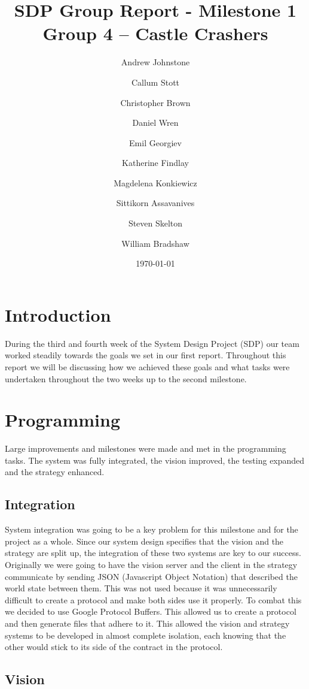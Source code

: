 \documentclass[12pt, a4paper, titlepage]{article}
\title{\small{SDP Group Report - Milestone 1} \\ \huge Group 4 -- Castle Crashers}
\author{Andrew Johnstone \and Callum Stott \and Christopher Brown \and Daniel Wren \and Emil Georgiev \and Katherine Findlay \and Magdelena Konkiewicz \and Sittikorn Assavanives \and Steven Skelton \and William Bradshaw}
\date{\today}
\begin{document}
\maketitle

\section{Introduction}

During the third and fourth week of the System Design Project (SDP) our team
worked steadily towards the goals we set in our first report. Throughout this
report we will be discussing how we achieved these goals and what tasks were
undertaken throughout the two weeks up to the second milestone.

\section{Programming}

Large improvements and milestones were made and met in the programming tasks.
The system was fully integrated, the vision improved, the testing expanded and
the strategy enhanced.

\subsection{Integration}

System integration was going to be a key problem for this milestone and for
the project as a whole. Since our system design specifies that the vision
and the strategy are split up, the integration of these two systems are
key to our success. Originally we were going to have the vision server and
the client in the strategy communicate by sending JSON (Javascript Object
Notation) that described the world state between them. This was not used
because it was unnecessarily difficult to create a protocol and make both
sides use it properly. To combat this we decided to use Google Protocol
Buffers\cite{protobuf}. This allowed us to create a protocol and then generate
files that adhere to it. This allowed the vision and strategy systems to be
developed in almost complete isolation, each knowing that the other would stick
to its side of the contract in the protocol.

\subsection{Vision}
\end{document}
